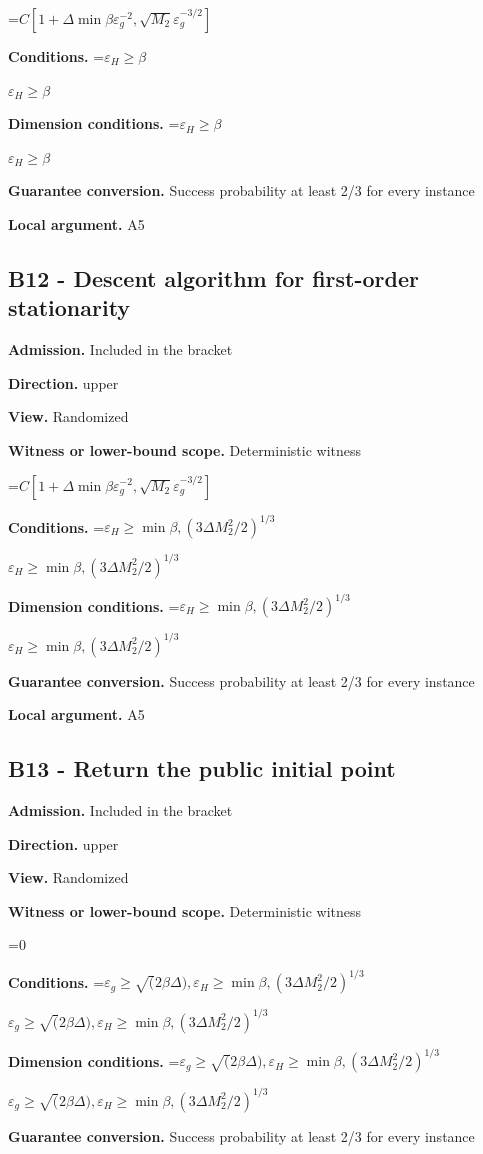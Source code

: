 \documentclass[10pt,a4paper]{article}
\newcommand{\AtlasMath}[1]{\par\begingroup\centering\setbox0=\hbox{$\displaystyle #1$}\ifdim\wd0>1.4\linewidth\typeout{ATLAS WIDE FORMULA: \the\wd0}\fi\ifdim\wd0>\linewidth\resizebox{\linewidth}{!}{\box0}\else\box0\fi\par\endgroup}
\newcommand{\AtlasInlineMath}[1]{\begingroup\setbox0=\hbox{$#1$}\ifdim\wd0>.4\linewidth\endgroup\AtlasMath{#1}\else\endgroup$#1$\fi}
\begin{document}
\AtlasMath{C[1+\Delta \min{\beta\varepsilon_g^{-2},\sqrt{M_2}\varepsilon_g^{-3/2}}]}
\textbf{Conditions.} \AtlasInlineMath{\varepsilon_H\ge \beta}

\textbf{Dimension conditions.} \AtlasInlineMath{\varepsilon_H\ge \beta}

\textbf{Guarantee conversion.} Success probability at least 2/3 for every instance

\textbf{Local argument.} A5

\subsection{B12 - Descent algorithm for first-order stationarity}
\textbf{Admission.} Included in the bracket

\textbf{Direction.} upper

\textbf{View.} Randomized

\textbf{Witness or lower-bound scope.} Deterministic witness

\AtlasMath{C[1+\Delta \min{\beta\varepsilon_g^{-2},\sqrt{M_2}\varepsilon_g^{-3/2}}]}
\textbf{Conditions.} \AtlasInlineMath{\varepsilon_H\ge \min{\beta,(3\Delta M_2^2/2)^{1/3}}}

\textbf{Dimension conditions.} \AtlasInlineMath{\varepsilon_H\ge \min{\beta,(3\Delta M_2^2/2)^{1/3}}}

\textbf{Guarantee conversion.} Success probability at least 2/3 for every instance

\textbf{Local argument.} A5

\subsection{B13 - Return the public initial point}
\textbf{Admission.} Included in the bracket

\textbf{Direction.} upper

\textbf{View.} Randomized

\textbf{Witness or lower-bound scope.} Deterministic witness

\AtlasMath{0}
\textbf{Conditions.} \AtlasInlineMath{\varepsilon_g\ge \sqrt(2\beta\Delta), \varepsilon_H\ge \min{\beta,(3\Delta M_2^2/2)^{1/3}}}

\textbf{Dimension conditions.} \AtlasInlineMath{\varepsilon_g\ge \sqrt(2\beta\Delta), \varepsilon_H\ge \min{\beta,(3\Delta M_2^2/2)^{1/3}}}

\textbf{Guarantee conversion.} Success probability at least 2/3 for every instance
\end{document}
